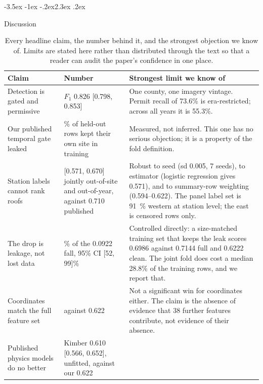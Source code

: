 \documentclass[10pt,twocolumn]{article}
\makeatletter
\renewcommand\section{\@startsection{section}{1}{\z@}%
  {-3.5ex \@plus -1ex \@minus -.2ex}{2.3ex \@plus.2ex}%
  {\normalfont\Large\bfseries\raggedright}}
\makeatother
\begin{document}
\section{Discussion}

\begin{table}[t]
  \centering
  \small
  \caption{Every headline claim, the number behind it, and the strongest objection we know
  of. Limits are stated here rather than distributed through the text so that a reader can
  audit the paper's confidence in one place.}
  \label{tab:claims}
  \begin{tabular}{p{4.6cm}>{\raggedright\arraybackslash}p{3.3cm}p{7.4cm}}
    \toprule
    \textbf{Claim} & \textbf{Number} & \textbf{Strongest limit we know of} \\
    \midrule
    Detection is gated and permissive
      & $F_1$ 0.826 [0.798, 0.853]
      & One county, one imagery vintage. Permit recall of 73.6\% is era-restricted; across
        all years it is 55.3\%. \\
    \addlinespace
    Our published temporal gate leaked
      & 88.7\% of held-out rows kept their own site in training
      & Measured, not inferred. This one has no serious objection; it is a property of the
        fold definition. \\
    \addlinespace
    Station labels cannot rank roofs
      & 0.622 [0.571, 0.670] jointly out-of-site and out-of-year, against 0.710 published
      & Robust to seed (sd 0.005, 7 seeds), to estimator (logistic regression gives 0.571),
        and to summary-row weighting (0.594--0.622). The panel label set is \SI{91}{\percent}
        western at station level; the east is censored rows only. \\
    \addlinespace
    The drop is leakage, not lost data
      & 83\% of the 0.0922 fall, 95\% CI [52, 99]\%
      & Controlled directly: a size-matched training set that keeps the leak scores 0.6986
        against 0.7144 full and 0.6222 clean. The joint fold does cost a median 28.8\% of
        the training rows, and we report that. \\
    \addlinespace
    Coordinates match the full feature set
      & 0.644 against 0.622
      & Not a significant win for coordinates either. The claim is the absence of evidence
        that 38 further features contribute, not evidence of their absence. \\
    \addlinespace
    Published physics models do no better
      & Kimber 0.610 [0.566, 0.652], unfitted, against our 0.622

\end{tabular}
\end{table}
\end{document}

